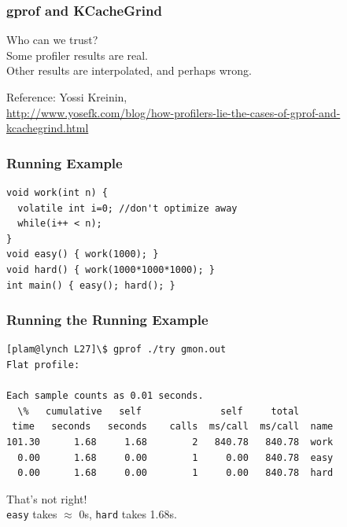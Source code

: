\begin{frame}
  \frametitle{gprof and KCacheGrind}
  
  
    Who can we trust?\\[1em]

    Some profiler results are real. \\
    Other results are interpolated, and perhaps wrong.
  

  \begin{center}
    Reference: Yossi Kreinin,\\
  \tiny
  \url{http://www.yosefk.com/blog/how-profilers-lie-the-cases-of-gprof-and-kcachegrind.html}
  \end{center}

\end{frame}

\begin{frame}[fragile]
  \frametitle{Running Example}

  \begin{center}
  \begin{minipage}{.7\textwidth}
\begin{lstlisting}
void work(int n) {
  volatile int i=0; //don't optimize away
  while(i++ < n);
}
void easy() { work(1000); }
void hard() { work(1000*1000*1000); }
int main() { easy(); hard(); }
\end{lstlisting}
  \end{minipage}
  \end{center}
  
\end{frame}

\begin{frame}[fragile]
  \frametitle{Running the Running Example}

{\scriptsize
\begin{verbatim}
[plam@lynch L27]\$ gprof ./try gmon.out
Flat profile:

Each sample counts as 0.01 seconds.
  \%   cumulative   self              self     total           
 time   seconds   seconds    calls  ms/call  ms/call  name    
101.30      1.68     1.68        2   840.78   840.78  work
  0.00      1.68     0.00        1     0.00   840.78  easy
  0.00      1.68     0.00        1     0.00   840.78  hard
\end{verbatim}
}

  That's not right! \\
  {\tt easy} takes $\approx$ 0s, {\tt hard} takes 1.68s.

\end{frame}

